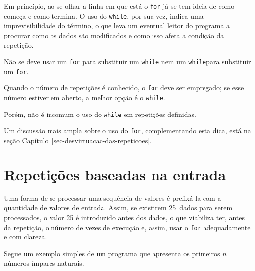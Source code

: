 \documentclass[
  11pt,
  a4paper,
]{scrbook}
\begin{document}
Em princípio, ao se olhar a linha em que está o \texttt{for} já se tem
ideia de como começa e como termina. O uso do \texttt{while}, por sua
vez, indica uma imprevisibilidade do término, o que leva um eventual
leitor do programa a procurar como os dados são modificados e como isso
afeta a condição da repetição.

\begin{tcolorbox}[enhanced jigsaw, arc=.35mm, bottomtitle=1mm, colbacktitle=quarto-callout-tip-color!10!white, title=\textcolor{quarto-callout-tip-color}{\faLightbulb}\hspace{0.5em}{Dica}, toprule=.15mm, left=2mm, opacityback=0, colback=white, colframe=quarto-callout-tip-color-frame, opacitybacktitle=0.6, bottomrule=.15mm, leftrule=.75mm, toptitle=1mm, coltitle=black, titlerule=0mm, rightrule=.15mm, breakable]

Não se deve usar um \texttt{for} para substituir um \texttt{while} nem
um \texttt{while}para substituir um \texttt{for}.

Quando o número de repetições é conhecido, o \texttt{for} deve ser
empregado; se esse número estiver em aberto, a melhor opção é o
\texttt{while}.

Porém, não é incomum o uso do \texttt{while} em repetições definidas.

Um discussão mais ampla sobre o uso do \texttt{for}, complementando esta
dica, está na seção Capítulo~\ref{sec-desvirtuacao-das-repeticoes}.

\end{tcolorbox}

\section{Repetições baseadas na
entrada}\label{repetiuxe7uxf5es-baseadas-na-entrada-1}

Uma forma de se processar uma sequência de valores é prefixá-la com a
quantidade de valores de entrada. Assim, se existirem 25~dados para
serem processados, o valor 25 é introduzido antes dos dados, o que
viabiliza ter, antes da repetição, o número de vezes de execução e,
assim, usar o \texttt{for} adequadamente e com clareza.

Segue um exemplo simples de um programa que apresenta os primeiros \(n\)
números ímpares naturais.
\end{document}
